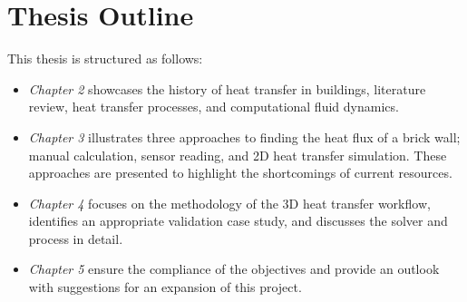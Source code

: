 \section{Thesis Outline}
This thesis is structured as follows:
\begin{itemize}
    \item \textit{Chapter 2} showcases the history of heat transfer in buildings, literature review, heat transfer processes, and computational fluid dynamics.
    \item \textit{Chapter 3} illustrates three approaches to finding the heat flux of a brick wall; manual calculation, sensor reading, and 2D heat transfer simulation. These approaches are presented to highlight the shortcomings of current resources. 
    \item \textit{Chapter 4} focuses on the methodology of the 3D heat transfer workflow, identifies an appropriate validation case study, and discusses the solver and process in detail.
    \item \textit{Chapter 5} ensure the compliance of the objectives and provide an outlook with suggestions for an expansion of this project.
\end{itemize}